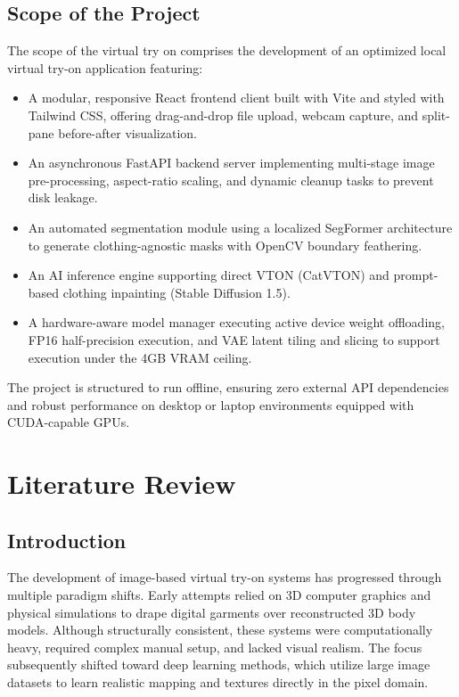 \documentclass[12pt, a4paper]{report}
\begin{document}
\section{Scope of the Project}

The scope of the virtual try on comprises the development of an optimized local virtual try-on application featuring:

\begin{itemize}
\item A modular, responsive React frontend client built with Vite and styled with Tailwind CSS, offering drag-and-drop file upload, webcam capture, and split-pane before-after visualization.
\item An asynchronous FastAPI backend server implementing multi-stage image pre-processing, aspect-ratio scaling, and dynamic cleanup tasks to prevent disk leakage.
\item An automated segmentation module using a localized SegFormer architecture to generate clothing-agnostic masks with OpenCV boundary feathering.
\item An AI inference engine supporting direct VTON (CatVTON) and prompt-based clothing inpainting (Stable Diffusion 1.5).
\item A hardware-aware model manager executing active device weight offloading, FP16 half-precision execution, and VAE latent tiling and slicing to support execution under the 4GB VRAM ceiling.
\end{itemize}

The project is structured to run offline, ensuring zero external API dependencies and robust performance on desktop or laptop environments equipped with CUDA-capable GPUs.

\chapter{Literature Review}

\section{Introduction}

The development of image-based virtual try-on systems has progressed through multiple paradigm shifts. Early attempts relied on 3D computer graphics and physical simulations to drape digital garments over reconstructed 3D body models. Although structurally consistent, these systems were computationally heavy, required complex manual setup, and lacked visual realism. The focus subsequently shifted toward deep learning methods, which utilize large image datasets to learn realistic mapping and textures directly in the pixel domain.
\end{document}
